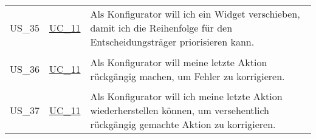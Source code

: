 \begin{footnotesize}
\begin{longtable}[L L L]{ p{} p{} p{} }
      \hypertarget{Ref:US35}{US\_35} & \hyperlink{Ref:UC11}{UC\_11} & Als Konfigurator will ich ein Widget verschieben, damit ich die Reihenfolge für den Entscheidungsträger priorisieren kann. \\
      \hypertarget{Ref:US36}{US\_36} & \hyperlink{Ref:UC11}{UC\_11} & Als Konfigurator will meine letzte Aktion rückgängig machen, um Fehler zu korrigieren. \\
      \hypertarget{Ref:US37}{US\_37} & \hyperlink{Ref:UC11}{UC\_11} & Als Konfigurator will ich meine letzte Aktion wiederherstellen können, um versehentlich rückgängig gemachte Aktion zu korrigieren. \\
      \bottomrule
    \end{longtable}
  \end{footnotesize}
  \rmfamily

